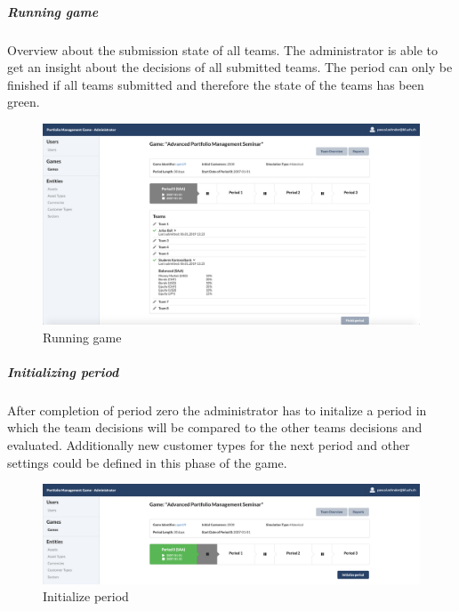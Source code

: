 \subparagraph{Running game}
Overview about the submission state of all teams. The administrator is able to get an insight about the decisions of all submitted teams. The period can only be finished if all teams submitted and therefore the state of the teams has been green.
\begin{figure}[h!]
  \centering
  \includegraphics[scale=0.2]{img/application-overview/administrator/07_running_game.png}
  \caption{Running game}
\end{figure}

\subparagraph{Initializing period}
After completion of period zero the administrator has to initalize a period in which the team decisions will be compared to the other teams decisions and evaluated. Additionally new customer types for the next period and other settings could be defined in this phase of the game.
\begin{figure}[h!]
  \centering
  \includegraphics[scale=0.2]{img/application-overview/administrator/08_period_initialization.png}
  \caption{Initialize period}
\end{figure}


